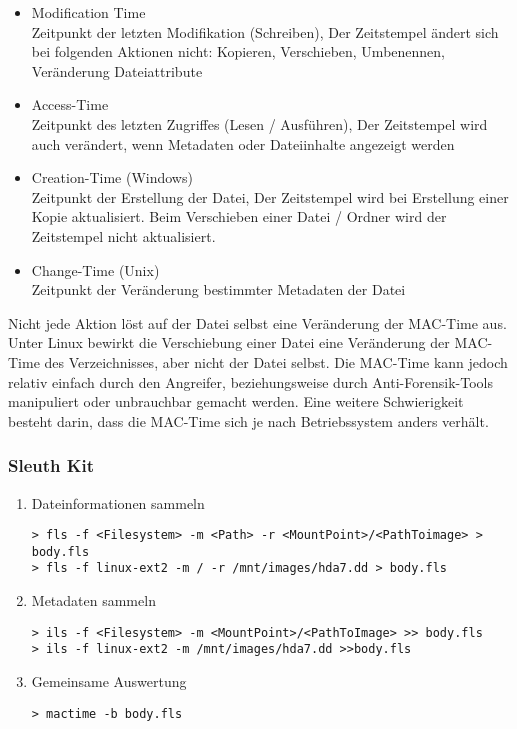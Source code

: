 \begin{itemize}
\item Modification Time\\
Zeitpunkt der letzten Modifikation (Schreiben), Der Zeitstempel ändert sich bei folgenden Aktionen nicht: Kopieren, Verschieben, Umbenennen, Veränderung Dateiattribute
\item Access-Time\\
Zeitpunkt des letzten Zugriffes (Lesen / Ausführen), Der Zeitstempel wird auch verändert, wenn Metadaten oder Dateiinhalte angezeigt werden
\item Creation-Time (Windows)\\
Zeitpunkt der Erstellung der Datei, Der Zeitstempel wird bei Erstellung einer Kopie aktualisiert. Beim Verschieben einer Datei / Ordner wird der Zeitstempel nicht aktualisiert.
\item Change-Time (Unix)\\
Zeitpunkt der Veränderung bestimmter Metadaten der Datei
\end{itemize}

Nicht jede Aktion löst auf der Datei selbst eine Veränderung der MAC-Time aus. Unter Linux bewirkt die Verschiebung einer Datei eine Veränderung der MAC-Time des Verzeichnisses, aber nicht der Datei selbst. Die MAC-Time kann jedoch relativ einfach durch den Angreifer, beziehungsweise durch Anti-Forensik-Tools manipuliert oder unbrauchbar gemacht werden. Eine weitere Schwierigkeit besteht darin, dass die MAC-Time sich je nach Betriebssystem anders verhält.


\subsubsection{Sleuth Kit}
\begin{enumerate}
\item Dateinformationen sammeln
\begin{lstlisting}
> fls -f <Filesystem> -m <Path> -r <MountPoint>/<PathToimage> > body.fls
> fls -f linux-ext2 -m / -r /mnt/images/hda7.dd > body.fls
\end{lstlisting}

\item Metadaten sammeln
\begin{lstlisting}
> ils -f <Filesystem> -m <MountPoint>/<PathToImage> >> body.fls
> ils -f linux-ext2 -m /mnt/images/hda7.dd >>body.fls
\end{lstlisting}

\item Gemeinsame Auswertung
\begin{lstlisting}
> mactime -b body.fls
\end{lstlisting}
\end{enumerate}

